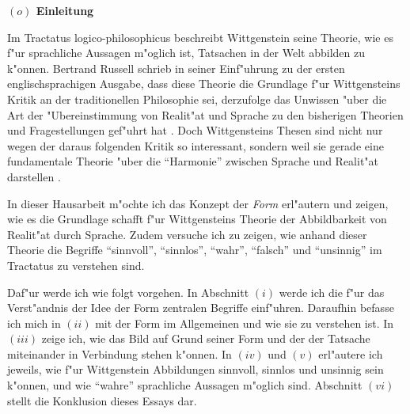 \documentclass[a4paper, emulatestandardclasses, 12pt]{scrartcl}
\begin{document}
\begin{onehalfspace} 



\noindent\textbf{$(o)$ Einleitung}

\noindent Im Tractatus logico-philosophicus \citep{wittgenstein1963tractatus} beschreibt Wittgenstein seine Theorie, wie es f"ur sprachliche Aussagen m"oglich ist, Tatsachen in der Welt abbilden zu k"onnen. Bertrand Russell schrieb in seiner Einf"uhrung zu der ersten englischsprachigen Ausgabe, dass diese Theorie die Grundlage f"ur Wittgensteins Kritik an der traditionellen Philosophie sei, derzufolge das Unwissen "uber die Art der "Ubereinstimmung von Realit"at und Sprache zu den bisherigen Theorien und Fragestellungen gef"uhrt hat \cite[vgl.][S. 7]{wittgenstein1922tractatus}. Doch Wittgensteins Thesen sind nicht nur wegen der daraus folgenden Kritik so interessant, sondern weil sie gerade eine fundamentale Theorie "uber die "`Harmonie"' zwischen Sprache und Realit"at darstellen \cite[vgl.][S. 1]{emiliani1999formsp}.

In dieser Hausarbeit m"ochte ich das Konzept der \emph{Form} erl"autern und zeigen, wie es die Grundlage schafft f"ur Wittgensteins Theorie der Abbildbarkeit von Realit"at durch Sprache. Zudem versuche ich zu zeigen, wie anhand dieser Theorie die Begriffe "`sinnvoll"', "`sinnlos"', "`wahr"', "`falsch"' und "`unsinnig"' im Tractatus zu verstehen sind.


Daf"ur werde ich wie folgt vorgehen. In Abschnitt $(i)$ werde ich die f"ur das Verst"andnis der Idee der Form zentralen Begriffe einf"uhren. Daraufhin befasse ich mich in $(ii)$ mit der Form im Allgemeinen und wie sie zu verstehen ist. In $(iii)$ zeige ich, wie das Bild auf Grund seiner Form und der der Tatsache miteinander in Verbindung stehen k"onnen. In $(iv)$ und $(v)$ erl"autere ich jeweils, wie f"ur Wittgenstein Abbildungen sinnvoll, sinnlos und unsinnig sein k"onnen, und wie "`wahre"' sprachliche Aussagen m"oglich sind. Abschnitt $(vi)$ stellt die Konklusion dieses Essays dar.
\vspace{5mm}




\end{onehalfspace}
\end{document}
